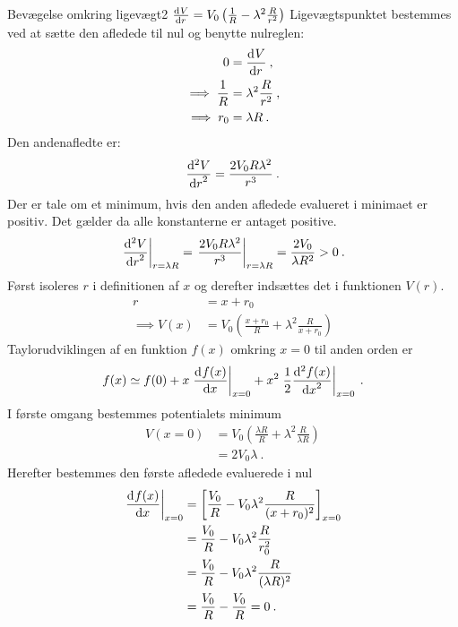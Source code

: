 \begin{opgave}{Bevægelse omkring ligevægt}{2}
\opg $\dif{r}{V} = V_0\left(\frac{1}{R} - \lambda^2\frac{R}{r^2}\right)$
\opg Ligevægtspunktet bestemmes ved at sætte den afledede til nul og benytte nulreglen:
\begin{align*}
	0 &= \dif{r}{V} \: , \\
	\implies \frac{1}{R} &= \lambda^2\frac{R}{r^2} \: , \\
	\implies r_0 &= \lambda R \: .
\end{align*}
\opg Den andenafledte er:
\begin{align*}
	\dif[2]{r}{V} = \frac{2V_0R\lambda^2}{r^3} \: .
\end{align*}
\opg Der er tale om et minimum, hvis den anden afledede evalueret i minimaet er positiv. Det gælder da alle konstanterne er antaget positive.
\begin{align*}
	\left.\dif[2]{r}{V}\right|_{r = \lambda R} = \left.\frac{2V_0R\lambda^2}{r^3}\right|_{r = \lambda R} = \frac{2V_0}{\lambda R^2} > 0 \: .
\end{align*}
\opg Først isoleres $r$ i definitionen af $x$ og derefter indsættes det i funktionen $V(r)$.
\begin{align*}
	r &= x + r_0 \\
	\implies V(x) &= V_0\left(\frac{x + r_0}{R} + \lambda^2\frac{R}{x + r_0}\right)
\end{align*}
\opg Taylorudviklingen af en funktion $f(x)$ omkring $x=0$ til anden orden er
\begin{align*}
	f(x) \simeq f(0) + x\left.\dif{x}{f(x)}\right|_{x=0} + x^2\left.\frac{1}{2}\dif[2]{x}{f(x)}\right|_{x=0} \: .
\end{align*}
I første omgang bestemmes potentialets minimum
\begin{align*}
	V(x=0) &= V_0\left(\frac{\lambda R}{R} + \lambda^2\frac{R}{\lambda R}\right) \\
	&= 2V_0\lambda \: .
\end{align*}
Herefter bestemmes den første afledede evaluerede i nul
\begin{align*}
	 \left.\dif{x}{f(x)}\right|_{x=0} &= \left[\frac{V_0}{R} - V_0\lambda^2\frac{R}{(x+r_0)^2}\right]_{x=0} \\
	 &= \frac{V_0}{R} - V_0\lambda^2\frac{R}{r_0^2} \\
	 &= \frac{V_0}{R} - V_0\lambda^2\frac{R}{(\lambda R)^2} \\
	 &= \frac{V_0}{R} - \frac{V_0}{R} = 0 \: .
\end{align*}

\end{opgave}
